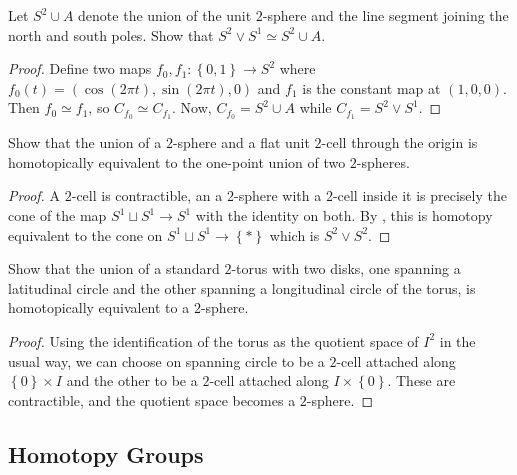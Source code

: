 \begin{problem}[]
    \cite[Ex 14.1]{Bredon} Let $S^2 \cup A$ denote the
    union of the unit $2$-sphere and the line segment
    joining the north and south poles. Show that
    $S^2 \vee S^{1} \simeq
    S^2 \cup A$.
\end{problem}

\begin{proof}
    Define two maps
    $f_0,f_1 \colon \left\{ 0,1 \right\}  \to 
    S^2$ where
    $f_0 (t) = \left( \cos (2\pi t), \sin(2\pi t), 0 \right) $ 
    and $f_1$ is the constant map at $(1,0,0)$. Then
    $f_0 \simeq f_1$, so $C_{f_0} \simeq C_{f_1}$. Now,
    $C_{f_0} = S^2 \cup  A$ while
    $C_{f_1} = S^2 \vee S^{1}$.
\end{proof}

\begin{problem}[]
    \cite[Ex 14.2]{Bredon} 
    Show that the union of a $2$-sphere and a flat
    unit  $2$-cell through the origin is homotopically
    equivalent to the one-point union of two $2$-spheres.
\end{problem}

\begin{proof}
    A $2$-cell is contractible, an
    a $2$-sphere with a $2$-cell inside it is precisely the
    cone of the map
    $S^1 \sqcup S^1 \to S^1$ with the identity on both.
    By \cite[Thm 14.19]{Bredon},
    this is homotopy equivalent to the cone on
    $S^1 \sqcup S^1 \to \left\{ * \right\} $ which is
    $S^2 \vee S^2$.
\end{proof}

\begin{problem}[]
    Show that the union of a standard $2$-torus with two disks,
    one spanning a latitudinal circle and the
    other spanning a longitudinal circle of the torus, is
    homotopically equivalent to a $2$-sphere.
\end{problem}

\begin{proof}
     Using the identification of the torus as the
     quotient space of $I^2$ in the usual way, we can choose
     on spanning circle to be a $2$-cell attached
     along $\left\{ 0 \right\} \times I$ and the
     other to be a $2$-cell attached along
     $I \times \left\{ 0 \right\} $. These are contractible, 
     and the quotient space becomes a $2$-sphere.
\end{proof}


\subsection{Homotopy Groups}

